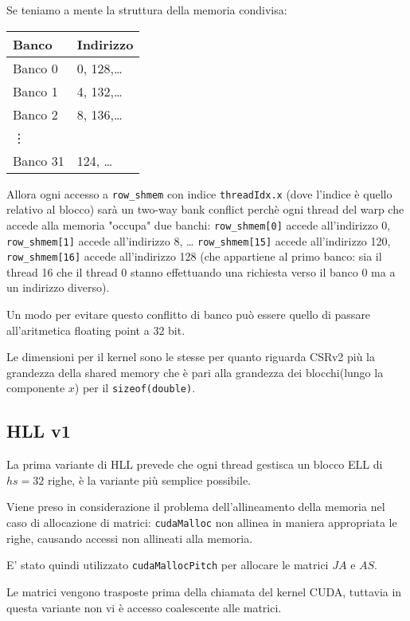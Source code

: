 \documentclass[9pt]{extarticle}
\begin{document}
Se teniamo a mente la struttura della memoria condivisa:

\begin{minipage}{\linewidth}
\centering
\begin{tabular}{|l l|}
\hline
\textbf{Banco} & \textbf{Indirizzo} \\
\hline
\hline
Banco 0 & 0, 128,\dots \\
Banco 1 & 4, 132,\dots \\
Banco 2 & 8, 136,\dots \\
\hline
\vdots & \\
\hline
Banco 31 & 124, \dots \\
\hline
\end{tabular}
\end{minipage}

Allora ogni accesso a \texttt{row\_shmem} con indice \texttt{threadIdx.x} (dove l'indice è quello relativo al blocco) sarà 
un two-way bank conflict perchè ogni thread del warp che accede alla memoria "occupa" due banchi:
\texttt{row\_shmem[0]} accede all'indirizzo 0, \texttt{row\_shmem[1]} accede all'indirizzo 8, \dots
\texttt{row\_shmem[15]} accede all'indirizzo 120, \texttt{row\_shmem[16]} accede all'indirizzo 128 (che appartiene al
primo banco: sia il thread 16 che il thread 0 stanno effettuando una richiesta verso il banco 0 ma a un indirizzo 
diverso).

Un modo per evitare questo conflitto di banco può essere quello di passare all'aritmetica floating point a 32 bit.

Le dimensioni per il kernel sono le stesse per quanto riguarda CSRv2 più la grandezza della shared memory che è pari
alla grandezza dei blocchi(lungo la componente $x$) per il \texttt{sizeof(double)}.

\subsection{HLL v1}
La prima variante di HLL prevede che ogni thread gestisca un blocco ELL di $hs=32$ righe, è la variante più semplice
possibile.

Viene preso in considerazione il problema dell'allineamento della memoria nel caso di allocazione di matrici:
\texttt{cudaMalloc} non allinea in maniera appropriata le righe, causando accessi non allineati alla memoria.

E' stato quindi utilizzato \texttt{cudaMallocPitch} per allocare le matrici $JA$ e $AS$.

Le matrici vengono trasposte prima della chiamata del kernel CUDA, tuttavia in questa variante non vi è accesso
coalescente alle matrici.
\end{document}
